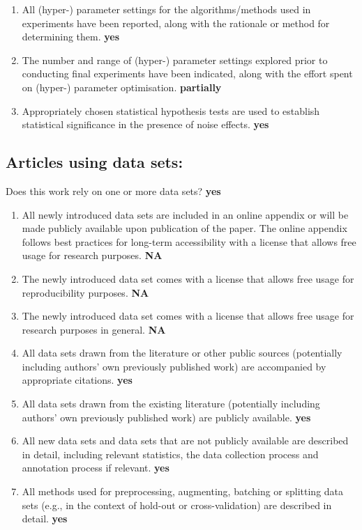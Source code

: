 \documentclass[manuscript, screen, review]{jair}
\theoremstyle{remark}
\begin{document}
\begin{enumerate}
    performance (e.g., average, median) to include measures of variation,
    confidence, or other distributional information. \textbf{yes}
    \item All (hyper-) parameter settings for the algorithms/methods used in
    experiments have been reported, along with the rationale or method for
    determining them. \textbf{yes}
    \item The number and range of (hyper-) parameter settings explored prior to
    conducting final experiments have been indicated, along with the effort
    spent on (hyper-) parameter optimisation. \textbf{partially}
    \item Appropriately chosen statistical hypothesis tests are used to
    establish statistical significance in the presence of noise effects.
    \textbf{yes}
\end{enumerate}

\subsection*{Articles using data sets:}
Does this work rely on one or more data sets? \textbf{yes}

\begin{enumerate}
    \item All newly introduced data sets are included in an online appendix or
    will be made publicly available upon publication of the paper. The online
    appendix follows best practices for long-term accessibility with a license
    that allows free usage for research purposes. \textbf{NA}
    \item The newly introduced data set comes with a license that allows free
    usage for reproducibility purposes. \textbf{NA}
    \item The newly introduced data set comes with a license that allows free
    usage for research purposes in general. \textbf{NA}
    \item All data sets drawn from the literature or other public sources
    (potentially including authors' own previously published work) are
    accompanied by appropriate citations. \textbf{yes}
    \item All data sets drawn from the existing literature (potentially
    including authors' own previously published work) are publicly available.
    \textbf{yes}
    \item All new data sets and data sets that are not publicly available are
    described in detail, including relevant statistics, the data collection
    process and annotation process if relevant. \textbf{yes}
    \item All methods used for preprocessing, augmenting, batching or splitting
    data sets (e.g., in the context of hold-out or cross-validation) are
    described in detail. \textbf{yes}
\end{enumerate}
\end{document}
